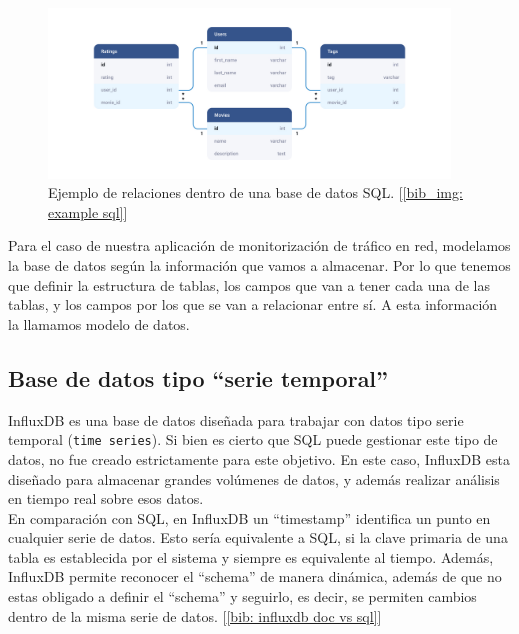 \documentclass[a4paper, oneside, 12pt]{book}
\begin{document}
	\begin{figure}[h!]
		\begin{center}
			\includegraphics[width=0.95\textwidth]{img/example_relational_database.jpg}
			\caption{Ejemplo de relaciones dentro de una base de datos SQL. [\ref{bib_img: example sql}]}
			\label{img: example sql}
		\end{center}
	\end{figure}
	
	\noindent Para el caso de nuestra aplicación de monitorización de tráfico en red, modelamos la base de datos según la información que vamos a almacenar. Por lo que tenemos que definir la estructura de tablas, los campos que van a tener cada una de las tablas, y los campos por los que se van a relacionar entre sí. A esta información la llamamos modelo de datos.
	
	
	
	\pagebreak
	
	\subsection{Base de datos tipo ``serie temporal''} 
	
	\noindent InfluxDB es una base de datos diseñada para trabajar con datos tipo serie temporal (\texttt{time series}). Si bien es cierto que SQL puede gestionar este tipo de datos, no fue creado estrictamente para este objetivo. En este caso, InfluxDB esta diseñado para almacenar grandes volúmenes de datos, y además realizar análisis en tiempo real sobre esos datos. \\
	
	\noindent En comparación con SQL, en InfluxDB un ``timestamp'' identifica un punto en cualquier serie de datos. Esto sería equivalente a SQL, si la clave primaria de una tabla es establecida por el sistema y siempre es equivalente al tiempo. Además, InfluxDB permite reconocer el ``schema'' de manera dinámica, además de que no estas obligado a definir el ``schema'' y seguirlo, es decir, se permiten cambios dentro de la misma serie de datos. [\ref{bib: influxdb doc vs sql}] \\
	
\end{document}

